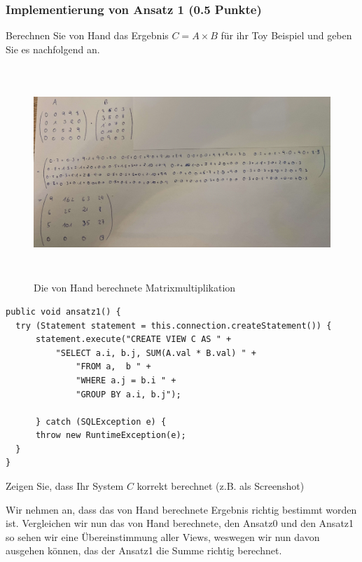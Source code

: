 \documentclass[11pt]{scrartcl}
\begin{document}
\subsubsection*{Implementierung von Ansatz 1 (0.5 Punkte)}
Berechnen Sie von Hand das Ergebnis $C = A \times B$ für ihr Toy Beispiel und geben Sie es nachfolgend an.
 
\begin{figure}
    \begin{center}
        \includegraphics[width=14.5cm,height=8cm]{20240512_200204.jpg}
        \caption{Die von Hand berechnete Matrixmultiplikation}
    \end{center}
 \end{figure}

\begin{lstlisting}[style=dmrJava]
public void ansatz1() {
  try (Statement statement = this.connection.createStatement()) {
      statement.execute("CREATE VIEW C AS " +
          "SELECT a.i, b.j, SUM(A.val * B.val) " +
              "FROM a,  b " +
              "WHERE a.j = b.i " +
              "GROUP BY a.i, b.j");

      } catch (SQLException e) {
      throw new RuntimeException(e);
  }
}
\end{lstlisting}

Zeigen Sie, dass Ihr System $C$ korrekt berechnet (z.B. als Screenshot)

Wir nehmen an, dass das von Hand berechnete Ergebnis richtig bestimmt worden ist.
Vergleichen wir nun das von Hand berechnete, den Ansatz0 und den Ansatz1 so sehen wir eine Übereinstimmung aller Views, weswegen wir nun davon ausgehen können, das der Ansatz1 die Summe richtig berechnet.
\end{document}
